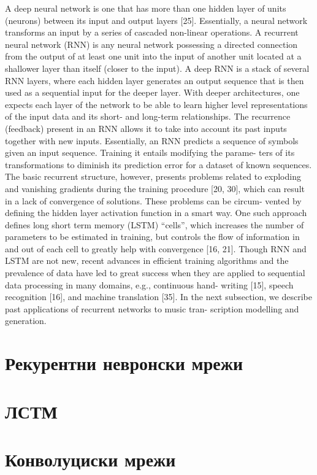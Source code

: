 \cite{Sturm2016} A deep neural network is one that has more than one hidden layer of units (neurons) between its input and output layers [25]. Essentially, a neural network transforms an input by a series of cascaded non-linear operations. A recurrent neural network (RNN) is any neural network possessing a directed connection from the output of at least one unit into the input of another unit located at a shallower layer than itself (closer to the input). A deep RNN is a stack of several RNN layers, where each hidden layer generates an output sequence that is then used as a sequential input for the deeper layer. With deeper architectures, one expects each layer of the network to be able to learn higher level representations of the input data and its short- and long-term relationships.
The recurrence (feedback) present in an RNN allows it to take into account
its past inputs together with new inputs. Essentially, an RNN predicts a sequence of symbols given an input sequence. Training it entails modifying the parame- ters of its transformations to diminish its prediction error for a dataset of known sequences. The basic recurrent structure, however, presents problems related to exploding and vanishing gradients during the training procedure [20, 30], which can result in a lack of convergence of solutions. These problems can be circum- vented by defining the hidden layer activation function in a smart way. One such approach defines long short term memory (LSTM) “cells”, which increases the number of parameters to be estimated in training, but controls the flow of information in and out of each cell to greatly help with convergence [16, 21]. Though RNN and LSTM are not new, recent advances in efficient training
algorithms and the prevalence of data have led to great success when they are applied to sequential data processing in many domains, e.g., continuous hand- writing [15], speech recognition [16], and machine translation [35]. In the next subsection, we describe past applications of recurrent networks to music tran- scription modelling and generation.
  
\section{Рекурентни невронски мрежи}

\section{ЛСТМ}
 
\section{Конволуциски мрежи}
 
